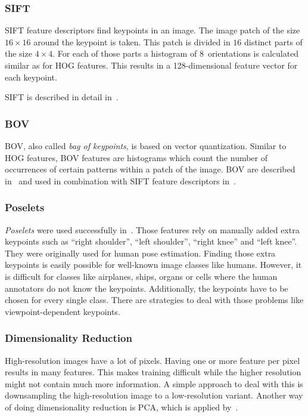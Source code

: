 \subsubsection{SIFT}
\Gls{SIFT} feature descriptors find keypoints in an image. The image patch of
the size $16 \times 16$ around the keypoint is taken. This patch is divided in
$16$ distinct parts of the size $4 \times 4$. For each of those parts a
histogram of 8~orientations is calculated similar as for \gls{HOG} features.
This results in a 128-dimensional feature vector for each keypoint.

\Gls{SIFT} is described in detail in~\cite{raey}.


\subsubsection{BOV}
\Gls{BOV}, also called \textit{bag of keypoints}, is based on vector
quantization. Similar to \gls{HOG} features, \gls{BOV} features are histograms
which count the number of occurrences of certain patterns within a patch of the
image. \Gls{BOV} are described in~\cite{csurka2004visual} and used in
combination with \gls{SIFT} feature descriptors in~\cite{csurka2008simple}.


\subsubsection{Poselets}
\textit{Poselets} were used successfully
in~\cite{bourdev2010detecting,brox2011object}. Those features rely on manually
added extra keypoints such as \enquote{right shoulder}, \enquote{left
shoulder}, \enquote{right knee} and \enquote{left knee}. They were originally
used for human pose estimation. Finding those extra keypoints is easily
possible for well-known image classes like humans. However, it is difficult for
classes like airplanes, ships, organs or cells where the human annotators do
not know the keypoints. Additionally, the keypoints have to be chosen for every
single class. There are strategies to deal with those problems like
viewpoint-dependent keypoints.


\subsubsection{Dimensionality Reduction}
High-resolution images have a lot of pixels. Having one or more feature per
pixel results in many features. This makes training difficult while the higher
resolution might not contain much more information. A simple approach to deal
with this is downsampling the high-resolution image to a low-resolution
variant. Another way of doing dimensionality reduction is \gls{PCA}, which is
applied by~\cite{chen2011pixel}.
